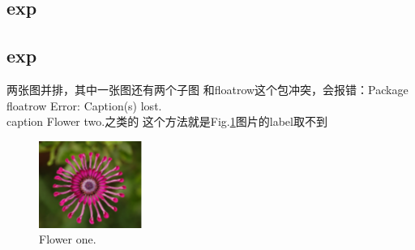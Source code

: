 \documentclass{article}
\begin{document}
\begin{CJK}{UTF8}{gbsn}
	

	
\section{exp}
\subsection{exp}

两张图并排，其中一张图还有两个子图
和floatrow这个包冲突，会报错：Package floatrow Error: Caption(s) lost. \\caption Flower two.之类的
这个方法就是Fig.\ref{fig:my_flower1}图片的label取不到
\begin{figure}[!tbp]
	\setlength{\abovecaptionskip}{0pt}
	\setlength{\belowcaptionskip}{0pt}
	\centering
	\begin{minipage}[b]{0.4\textwidth}
		\includegraphics[width=\textwidth]{imgs/flower1.png}
		\caption{Flower one.}
		\label{fig:my_flower1}  %
	\end{minipage}
	\hfill %
	\begin{minipage}[b]{0.55\textwidth}
\end{minipage}
\end{figure}
\end{CJK}
\end{document}
